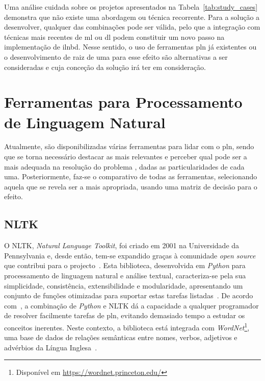 Uma análise cuidada sobre os projetos apresentados na Tabela~\ref{tab:study_cases} demonstra que não existe uma abordagem ou técnica recorrente. Para a solução a desenvolver, qualquer das combinações pode ser válida, pelo que a integração com técnicas mais recentes de \gls{ml} ou \gls{dl} podem constituir um novo passo na implementação de \gls{ilnbd}. Nesse sentido, o uso de ferramentas \gls{pln} já existentes ou o desenvolvimento de raiz de uma para esse efeito são alternativas a ser consideradas e cuja conceção da solução irá ter em consideração.

\section{Ferramentas para Processamento de Linguagem Natural}
\label{sec:chap03_existingtools}
Atualmente, são disponibilizadas várias ferramentas para lidar com o \gls{pln}, sendo que se torna necessário destacar as mais relevantes e perceber qual pode ser a mais adequada na resolução do problema , dadas as particularidades de cada uma. Posteriormente, faz-se o comparativo de todas as ferramentas, selecionando aquela que se revela ser a mais apropriada, usando uma matriz de decisão para o efeito.

\subsection{NLTK}
O NLTK, \textit{Natural Language Toolkit}, foi criado em 2001 na Universidade da Pennsylvania e, desde então, tem-se expandido graças à comunidade \textit{open source} que contribui para o projecto~\parencite{applied_natural_language_processing_with_python}. Esta biblioteca, desenvolvida em \textit{Python} para processamento de linguagem natural e análise textual, caracteriza-se pela sua simplicidade, consistência, extensibilidade e modularidade, apresentando um conjunto de funções otimizadas para suportar estas tarefas listadas~\parencite{applied_natural_language_processing_with_python, python_text_processing_nltk_cookbook}. De acordo com~\textcite{nltk_education_scientific_purposes}, a combinação de \textit{Python} e NLTK dá a capacidade a qualquer programador de resolver facilmente tarefas de \gls{pln}, evitando demasiado tempo a  estudar os conceitos inerentes. Neste contexto, a biblioteca está integrada com \textit{WordNet}\footnote{Disponível em \url{https://wordnet.princeton.edu/}}, uma base de dados de relações semânticas entre nomes, verbos, adjetivos e advérbios da Língua Inglesa~\parencite{nltk_education_scientific_purposes}.

